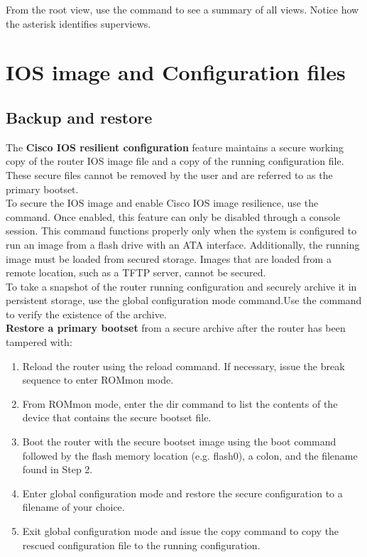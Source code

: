 From the root view, use the  command to see a summary of all views. Notice how the asterisk identifies superviews.

\section{IOS image and Configuration files}

\subsection{Backup and restore}

The \textbf{Cisco IOS resilient configuration} feature maintains a secure working copy of the router IOS image file and a copy of the running configuration file. These secure files cannot be removed by the user and are referred to as the primary bootset.\\

To secure the IOS image and enable Cisco IOS image resilience, use the  command. Once enabled, this feature can only be disabled through a console session. This command functions properly only when the system is configured to run an image from a flash drive with an ATA interface. Additionally, the running image must be loaded from secured storage. Images that are loaded from a remote location, such as a TFTP server, cannot be secured.\\

To take a snapshot of the router running configuration and securely archive it in persistent storage, use the  global configuration mode command.Use the  command to verify the existence of the archive.\\

\textbf{Restore a primary bootset} from a secure archive after the router has been tampered with:

\begin{enumerate}
\item Reload the router using the reload command. If necessary, issue the break sequence to enter ROMmon mode.
\item From ROMmon mode, enter the dir command to list the contents of the device that contains the secure bootset file.
\item Boot the router with the secure bootset image using the boot command followed by the flash memory location (e.g. flash0), a colon, and the filename found in Step 2.
\item Enter global configuration mode and restore the secure configuration to a filename of your choice.
\item Exit global configuration mode and issue the copy command to copy the rescued configuration file to the running configuration.
\end{enumerate}

